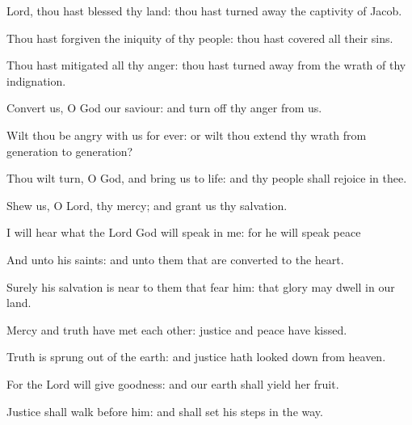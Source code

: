 ﻿\item Lord, thou hast blessed thy land: thou hast turned away the captivity of Jacob.
\item Thou hast forgiven the iniquity of thy people: thou hast covered all their sins.
\item Thou hast mitigated all thy anger: thou hast turned away from the wrath of thy indignation.
\item Convert us, O God our saviour: and turn off thy anger from us.
\item Wilt thou be angry with us for ever: or wilt thou extend thy wrath from generation to generation?
\item Thou wilt turn, O God, and bring us to life: and thy people shall rejoice in thee.
\item Shew us, O Lord, thy mercy; and grant us thy salvation.
\item I will hear what the Lord God will speak in me: for he will speak peace
\item And unto his saints: and unto them that are converted to the heart.
\item Surely his salvation is near to them that fear him: that glory may dwell in our land.
\item Mercy and truth have met each other: justice and peace have kissed.
\item Truth is sprung out of the earth: and justice hath looked down from heaven.
\item For the Lord will give goodness: and our earth shall yield her fruit.
\item Justice shall walk before him: and shall set his steps in the way.
